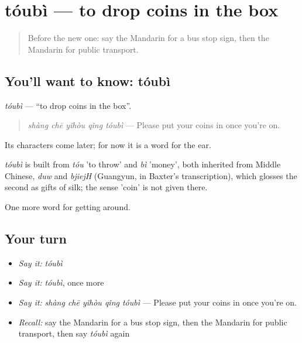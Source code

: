 \section[tóubì]{tóubì — to drop coins in the box}

\label{lesson:ZH-C408-toubi}



\begin{quote}
Before the new one: say the Mandarin for a bus stop sign, then the Mandarin for public transport.
\end{quote}

\subsection*{You'll want to know: tóubì}
\emph{tóubì} — \textquotedblleft{}to drop coins in the box\textquotedblright{}.

\begin{quote}
\emph{shàng chē yǐhòu qǐng tóubì} — Please put your coins in once you're on.
\end{quote}

Its characters come later; for now it is a word for the ear.

\begin{cousinweb}
\emph{tóubì} is built from \emph{tóu} 'to throw' and \emph{bì} 'money', both inherited from Middle Chinese, \emph{duw} and \emph{bjiejH} (Guangyun, in Baxter's transcription), which glosses the second as gifts of silk; the sense 'coin' is not given there.
\end{cousinweb}

\begin{grammarlens}[title={What you've built}]
One more word for getting around.
\end{grammarlens}

\subsection*{Your turn}
\begin{itemize}
\raggedright
  \item \emph{Say it:} \emph{tóubì}
  \item \emph{Say it:} \emph{tóubì}, once more
  \item \emph{Say it:} \emph{shàng chē yǐhòu qǐng tóubì} — Please put your coins in once you're on.
  \item \emph{Recall:} say the Mandarin for a bus stop sign, then the Mandarin for public transport, then say \emph{tóubì} again
\end{itemize}

